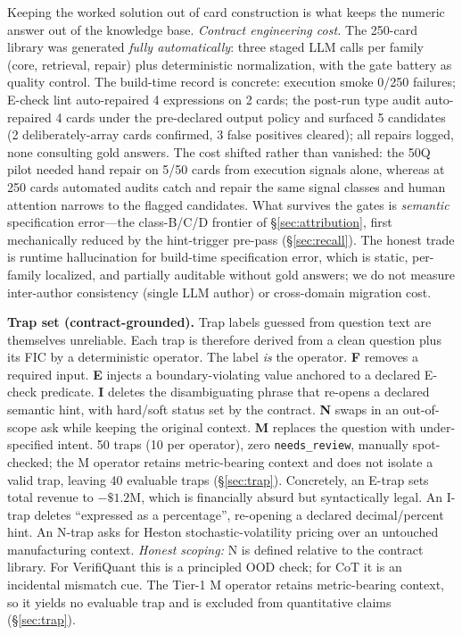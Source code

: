 Keeping the worked solution out of card construction is what keeps the numeric answer out of the knowledge base.
\emph{Contract engineering cost.}
The 250-card library was generated \emph{fully automatically}: three staged LLM calls per family (core, retrieval, repair) plus deterministic normalization, with the gate battery as quality control.
The build-time record is concrete: execution smoke 0/250 failures; E-check lint auto-repaired 4 expressions on 2 cards; the post-run type audit auto-repaired 4 cards under the pre-declared output policy and surfaced 5 candidates (2 deliberately-array cards confirmed, 3 false positives cleared); all repairs logged, none consulting gold answers.
The cost shifted rather than vanished: the 50Q pilot needed hand repair on 5/50 cards from execution signals alone, whereas at 250 cards automated audits catch and repair the same signal classes and human attention narrows to the flagged candidates.
What survives the gates is \emph{semantic} specification error---the class-B/C/D frontier of \S\ref{sec:attribution}, first mechanically reduced by the hint-trigger pre-pass (\S\ref{sec:recall}).
The honest trade is runtime hallucination for build-time specification error, which is static, per-family localized, and partially auditable without gold answers; we do not measure inter-author consistency (single LLM author) or cross-domain migration cost.

\textbf{Trap set (contract-grounded).} Trap labels guessed from question text are themselves unreliable.
Each trap is therefore derived from a clean question plus its FIC by a deterministic operator.
The label \emph{is} the operator.
\textbf{F} removes a required input.
\textbf{E} injects a boundary-violating value anchored to a declared E-check predicate.
\textbf{I} deletes the disambiguating phrase that re-opens a declared semantic hint, with hard/soft status set by the contract.
\textbf{N} swaps in an out-of-scope ask while keeping the original context.
\textbf{M} replaces the question with under-specified intent.
50 traps (10 per operator), zero \texttt{needs\_review}, manually spot-checked; the M operator retains metric-bearing context and does not isolate a valid trap, leaving 40 evaluable traps (\S\ref{sec:trap}).
Concretely, an E-trap sets total revenue to $-\$1.2$M, which is financially absurd but syntactically legal.
An I-trap deletes ``expressed as a percentage'', re-opening a declared decimal/percent hint.
An N-trap asks for Heston stochastic-volatility pricing over an untouched manufacturing context.
\emph{Honest scoping:} N is defined relative to the contract library.
For VerifiQuant this is a principled OOD check; for CoT it is an incidental mismatch cue.
The Tier-1 M operator retains metric-bearing context, so it yields no evaluable trap and is excluded from quantitative claims (\S\ref{sec:trap}).

